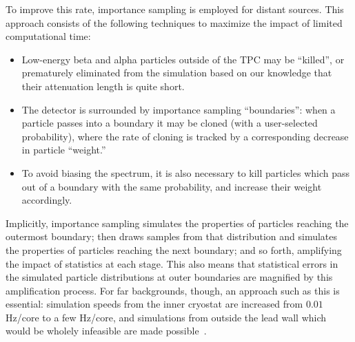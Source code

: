 To improve this rate, importance sampling is employed for distant sources.  This approach consists of the following techniques to maximize the impact of limited computational time:~\cite{Dressel:642987,MCDocumentRun2a}
\begin{itemize}
\item Low-energy beta and alpha particles outside of the TPC may be ``killed'', or prematurely eliminated from the simulation based on our knowledge that their attenuation length is quite short.
\item The detector is surrounded by importance sampling ``boundaries'': when a particle passes into a boundary it may be cloned (with a user-selected probability), where the rate of cloning is tracked by a corresponding decrease in particle ``weight.''
\item To avoid biasing the spectrum, it is also necessary to kill particles which pass out of a boundary with the same probability, and increase their weight accordingly.
\end{itemize}
Implicitly, importance sampling simulates the properties of particles reaching the outermost boundary; then draws samples from that distribution and simulates the properties of particles reaching the next boundary; and so forth, amplifying the impact of statistics at each stage.  This also means that statistical errors in the simulated particle distributions at outer boundaries are magnified by this amplification process.  For far backgrounds, though, an approach such as this is essential:  simulation speeds from the inner cryostat are increased from $0.01$ Hz/core to a few Hz/core, and simulations from outside the lead wall which would be wholely infeasible are made possible~\cite{MCDocumentRun2a}.

